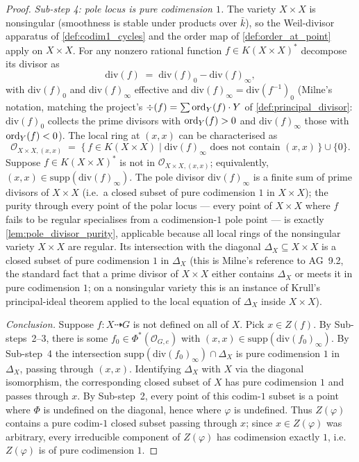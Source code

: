 \begin{proof}
  \emph{Sub-step 4: pole locus is pure codimension \(1\).} The variety \(X \times X\) is
  nonsingular (smoothness is stable under products over \(\bar k\)), so the Weil-divisor
  apparatus of \cref{def:codim1_cycles} and the order map of
  \cref{def:order_at_point} apply on \(X \times X\). For any nonzero rational function
  \(f \in K(X \times X)^\ast\) decompose its divisor as
  \[
    \mathrm{div}(f) \;=\; \mathrm{div}(f)_0 - \mathrm{div}(f)_\infty,
  \]
  with \(\mathrm{div}(f)_0\) and \(\mathrm{div}(f)_\infty\) effective and
  \(\mathrm{div}(f)_\infty = \mathrm{div}(f^{-1})_0\) (Milne's notation, matching the
  project's \(\div(f) = \sum \operatorname{ord}_Y(f) \cdot Y\) of
  \cref{def:principal_divisor}: \(\mathrm{div}(f)_0\) collects the prime divisors with
  \(\operatorname{ord}_Y(f) > 0\) and \(\mathrm{div}(f)_\infty\) those with \(\operatorname{ord}_Y(f) < 0\)). The local
  ring at \((x, x)\) can be characterised as
  \[
    \mathcal O_{X \times X, (x, x)}
    \;=\; \bigl\{\, f \in K(X \times X) \;\big|\;
    \mathrm{div}(f)_\infty \text{ does not contain } (x, x) \,\bigr\} \cup \{0\}.
  \]
  Suppose \(f \in K(X \times X)^\ast\) is not in \(\mathcal O_{X \times X, (x, x)}\);
  equivalently, \((x, x) \in \mathrm{supp}(\mathrm{div}(f)_\infty)\). The pole divisor
  \(\mathrm{div}(f)_\infty\) is a finite sum of prime divisors of \(X \times X\) (i.e.\ a
  closed subset of pure codimension \(1\) in \(X \times X\)); the purity through every
  point of the polar locus --- every point of \(X \times X\) where \(f\) fails to be
  regular specialises from a codimension-\(1\) pole point --- is exactly
  \cref{lem:pole_divisor_purity}, applicable because all local rings of the
  nonsingular variety \(X \times X\) are regular. Its intersection with the
  diagonal \(\Delta_X \subseteq X \times X\) is a closed subset of pure codimension \(1\)
  in \(\Delta_X\) (this is Milne's reference to AG~9.2, the standard fact that a prime
  divisor of \(X \times X\) either contains \(\Delta_X\) or meets it in pure codimension
  \(1\); on a nonsingular variety this is an instance of Krull's principal-ideal theorem
  applied to the local equation of \(\Delta_X\) inside \(X \times X\)).

  \emph{Conclusion.} Suppose \(f \colon X \dashrightarrow G\) is not defined on all of
  \(X\). Pick \(x \in Z(f)\). By Sub-steps~2--3, there is some \(f_0 \in
  \Phi^\ast(\mathcal O_{G, e})\) with \((x, x) \in \mathrm{supp}(\mathrm{div}(f_0)_\infty)\).
  By Sub-step~4 the intersection \(\mathrm{supp}(\mathrm{div}(f_0)_\infty) \cap
  \Delta_X\) is pure codimension \(1\) in \(\Delta_X\), passing through \((x, x)\).
  Identifying \(\Delta_X\) with \(X\) via the diagonal isomorphism, the corresponding
  closed subset of \(X\) has pure codimension \(1\) and passes through \(x\). By Sub-step~2,
  every point of this codim-\(1\) subset is a point where \(\Phi\) is undefined on the
  diagonal, hence where \(\varphi\) is undefined. Thus \(Z(\varphi)\) contains a pure
  codim-\(1\) closed subset passing through \(x\); since \(x \in Z(\varphi)\) was arbitrary,
  every irreducible component of \(Z(\varphi)\) has codimension exactly \(1\), i.e.\
  \(Z(\varphi)\) is of pure codimension \(1\).
\end{proof}

